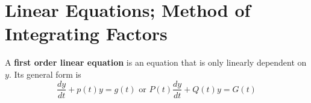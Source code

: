 \section{Linear Equations; Method of Integrating Factors}
    A \textbf{first order linear equation} is an equation that is only linearly dependent on $y$. Its general form is
    \begin{equation*}
        \frac{dy}{dt} + p(t)y = g(t) \text{ or } P(t)\frac{dy}{dt} + Q(t)y = G(t)
    \end{equation*}
    